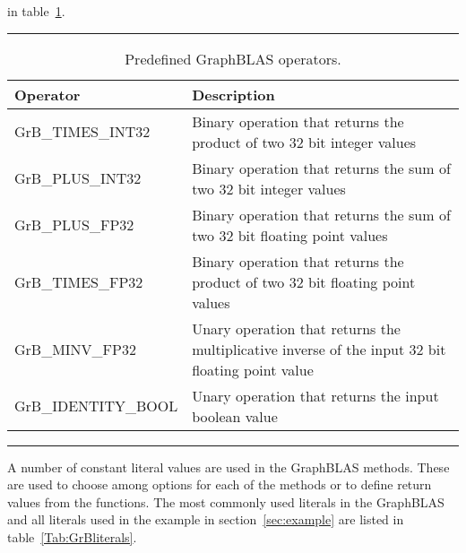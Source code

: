 in table~\ref{Tab:GrBops}. 
\begin{table}[h]
\hrule
\begin{center}
\caption{Predefined GraphBLAS operators.}
\label{Tab:GrBops}
\begin{tabular}{lp{5.25cm}}
Operator                          & Description  \\
\hline
GrB\_TIMES\_INT32       & Binary operation that returns the product of two 32 bit integer values \\
GrB\_PLUS\_INT32         & Binary operation that returns the sum of two 32 bit integer values \\
GrB\_PLUS\_FP32          & Binary operation that returns the sum of two 32 bit floating point values \\
GrB\_TIMES\_FP32        & Binary operation that returns the product of two 32 bit floating point values \\
GrB\_MINV\_FP32          & Unary operation that returns the multiplicative inverse of the input 32 bit floating point value \\
GrB\_IDENTITY\_BOOL  & Unary operation that returns the input boolean value \\
\end{tabular}
\end{center}
\hrule
\end{table}
A number of constant literal values are used in the GraphBLAS methods.  These are used to 
choose among options for each of the methods or to define return values from the functions.
The most commonly used literals in the GraphBLAS and all literals used in the example in 
section~\ref{sec:example} are listed in table~\ref{Tab:GrBliterals}.
